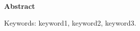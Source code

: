 {}
\begin{center}
  {\bfseries\chinnesesize Abstract}
\end{center}

\blindtext[1]

\noindent Keywords: keyword1, keyword2, keyword3.
\clearpage
